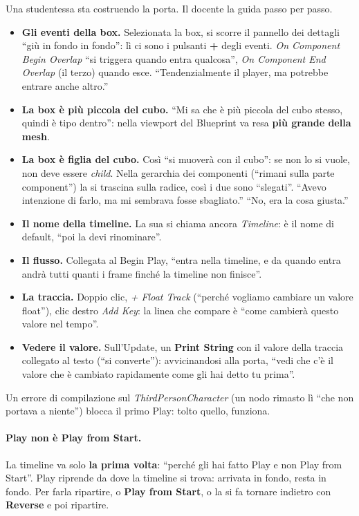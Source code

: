 Una studentessa sta costruendo la porta. Il docente la guida passo per passo.
\begin{itemize}
  \item \textbf{Gli eventi della box.} Selezionata la box, si scorre il
        pannello dei dettagli ``giù in fondo in fondo'': lì ci sono i
        pulsanti \textbf{+} degli eventi. \emph{On Component Begin Overlap}
        ``si triggera quando entra qualcosa'', \emph{On Component End Overlap}
        (il terzo) quando esce. ``Tendenzialmente il player, ma potrebbe
        entrare anche altro.''
  \item \textbf{La box è più piccola del cubo.} ``Mi sa che è più piccola del
        cubo stesso, quindi è tipo dentro'': nella viewport del Blueprint va
        resa \textbf{più grande della mesh}.
  \item \textbf{La box è figlia del cubo.} Così ``si muoverà con il cubo'':
        se non lo si vuole, non deve essere \emph{child}. Nella gerarchia dei
        componenti (``rimani sulla parte component'') la si trascina
        sulla radice, così i due sono ``slegati''. ``Avevo intenzione di farlo,
        ma mi sembrava fosse sbagliato.'' ``No, era la cosa giusta.''
  \item \textbf{Il nome della timeline.} La sua si chiama ancora
        \emph{Timeline}: è il nome di default, ``poi la devi rinominare''.
  \item \textbf{Il flusso.} Collegata al Begin Play, ``entra nella timeline, e
        da quando entra andrà tutti quanti i frame finché la timeline non
        finisce''.
  \item \textbf{La traccia.} Doppio clic, \emph{+ Float Track} (``perché
        vogliamo cambiare un valore float''), clic destro \emph{Add Key}: la
        linea che compare è ``come cambierà questo valore nel tempo''.
  \item \textbf{Vedere il valore.} Sull'Update, un \textbf{Print String} con
        il valore della traccia collegato al testo (``si converte''): avvicinandosi
        alla porta, ``vedi che c'è il valore che è cambiato rapidamente come gli
        hai detto tu prima''.
\end{itemize}
Un errore di compilazione sul \emph{ThirdPersonCharacter} (un nodo rimasto lì
``che non portava a niente'') blocca il primo Play: tolto quello, funziona.

\paragraph{Play non è Play from Start.} La timeline va solo \textbf{la prima
volta}: ``perché gli hai fatto Play e non Play from Start''. Play riprende da
dove la timeline si trova: arrivata in fondo, resta in fondo. Per farla
ripartire, o \textbf{Play from Start}, o la si fa tornare indietro con
\textbf{Reverse} e poi ripartire.

